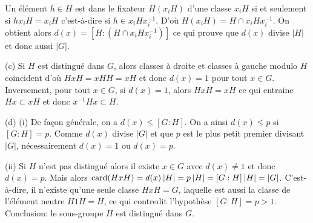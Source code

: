 {{\hskip 5mm Un \'el\'ement $h\in H$ est dans le fixateur $H(x_iH)$ d'une classe
$x_iH$ si et seulement si $hx_iH=x_iH$ c'est-\`a-dire si $h\in x_iHx_i^{-1}$. D'o\`u
$H(x_iH)= H\cap x_iHx_i^{-1}$. On obtient alors $d(x)= [H:(H\cap x_iHx_i^{-1})]$ ce
qui prouve que $d(x)$ divise $|H|$ et donc aussi $|G|$.
\smallskip

(c) Si $H$ est distingu\'e dans $G$, alors classes \`a droite et classes \`a
gauche modulo $H$ coincident d'o\`u $HxH=xHH=xH$ et donc $d(x)=1$ pour tout $x\in
G$. Inversement, pour tout $x\in G$, si $d(x)=1$, alors $HxH=xH$ ce qui entraine
$Hx\subset xH$ et donc $x^{-1}Hx \subset H$.
\smallskip

(d) (i) De fa\c con g\'en\'erale, on a $d(x) \leq [G:H]$. On a ainsi $d(x) \leq p$
si $[G:H]=p$. Comme $d(x)$ divise $|G|$ et que $p$ est le plus petit premier
divisant $|G|$, n\'ecessairement $d(x)=1$ ou $d(x)=p$.
\smallskip

(ii) Si $H$ n'est pas distingu\'e alors il existe $x\in G$ avec $d(x)\not=1$ et
donc $d(x)=p$. Mais alors $\hbox{\rm card}(HxH) = d(x)\hskip 2pt |H| = p\hskip 2pt
|H| = [G:H]\hskip 2pt |H| = |G|$. C'est-\`a-dire, il n'existe qu'une seule classe
$HxH=G$, laquelle est aussi la classe de l'\'el\'ement neutre $H1H=H$, ce qui
contredit l'hypoth\`ese $[G:H]=p>1$. Conclusion: le sous-groupe $H$ est distingu\'e
dans $G$.
}
}
